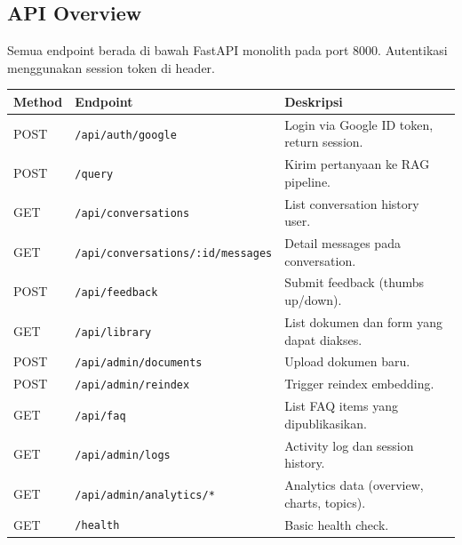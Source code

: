 \documentclass[11pt,a4paper]{article}
\begin{document}
\newpage
\subsection{API Overview}
Semua endpoint berada di bawah FastAPI monolith pada port 8000. Autentikasi menggunakan session token di header.

\begin{tabularx}{\linewidth}{@{}p{2.2cm}p{5.5cm}X@{}}
\toprule \textbf{Method} & \textbf{Endpoint} & \textbf{Deskripsi} \\ \midrule
POST & \texttt{/api/auth/google} & Login via Google ID token, return session. \\
POST & \texttt{/query} & Kirim pertanyaan ke RAG pipeline. \\
GET & \texttt{/api/conversations} & List conversation history user. \\
GET & \texttt{/api/conversations/:id/messages} & Detail messages pada conversation. \\
POST & \texttt{/api/feedback} & Submit feedback (thumbs up/down). \\
GET & \texttt{/api/library} & List dokumen dan form yang dapat diakses. \\
POST & \texttt{/api/admin/documents} & Upload dokumen baru. \\
POST & \texttt{/api/admin/reindex} & Trigger reindex embedding. \\
GET & \texttt{/api/faq} & List FAQ items yang dipublikasikan. \\
GET & \texttt{/api/admin/logs} & Activity log dan session history. \\
GET & \texttt{/api/admin/analytics/*} & Analytics data (overview, charts, topics). \\
GET & \texttt{/health} & Basic health check. \\
\bottomrule
\end{tabularx}

\newpage
\end{document}
